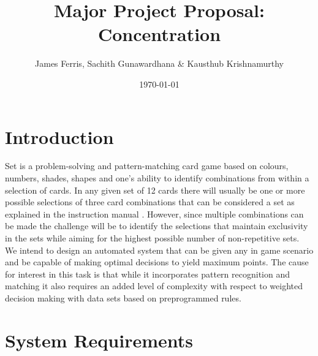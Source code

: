 \documentclass[dvips,12pt]{article}
\begin{document}

\title{Major Project Proposal: Concentration}
\author{James Ferris, Sachith Gunawardhana \& Kausthub Krishnamurthy}
\date{\today}



\maketitle


\section{Introduction}


Set is a problem-solving and pattern-matching card game based on colours, numbers, shades, shapes and one's ability to identify combinations from within a selection of cards. In any given set of 12 cards there will usually be one or more possible selections of three card combinations that can be considered a set as explained in the instruction manual \cite{setInstructions}. However, since multiple combinations can be made the challenge will be to identify the selections that maintain exclusivity in the sets while aiming for the highest possible number of non-repetitive sets.\\

We intend to design an automated system that can be given any in game scenario and be capable of making optimal decisions to yield maximum points. The cause for interest in this task is that while it incorporates pattern recognition and matching it also requires an added level of complexity with respect to weighted decision making with data sets based on preprogrammed rules.


\section{System Requirements}
\end{document}
